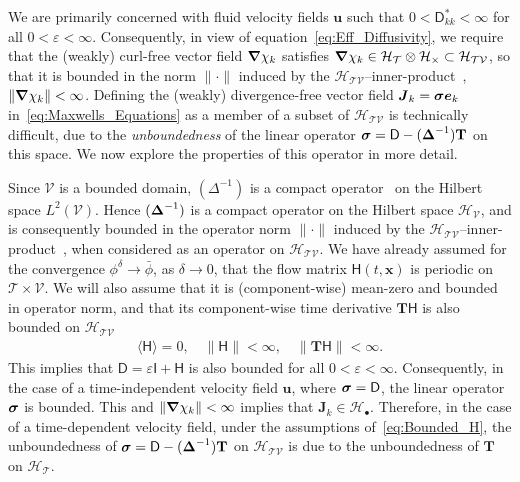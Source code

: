 \documentclass[leqno,onefignum,onetabnum]{siamltex1213}
\newcommand{\Tb}{\mathbf{T}}
\newcommand{\Tc}{\mathcal{T}}
\newcommand{\Vc}{\mathcal{V}}
\newcommand{\Hc}{\mathcal{H}}
\newcommand{\Dm}{\mathsf{D}}
\newcommand{\Hm}{\mathsf{H}}
\newcommand{\Ib}{\mathsf{I}}
\newcommand\bsig{\mbox{\boldmath${\sigma}$}}
\newcommand\bDelta{\mbox{\boldmath${\Delta}$}}
\newcommand\bnabla{\mbox{\boldmath${\nabla}$}}
\newcommand{\vecJ}{\boldsymbol{J}}
\newcommand{\vecx}{\boldsymbol{x}}
\newcommand{\vecu}{\boldsymbol{u}}
\newcommand{\vece}{\boldsymbol{e}}
\begin{document}
We are primarily concerned with fluid velocity fields $\vecu $ such
that $0<\Dm^*_{kk}<\infty$ for all $0<\varepsilon<\infty$. Consequently, in view of
equation~\eqref{eq:Eff_Diffusivity}, we require that the (weakly)
curl-free vector field $\bnabla \chi_k$ satisfies
$\bnabla \chi_k\in\Hc_{\Tc}\otimes\Hc_\times\subset\Hc_{\Tc\Vc}$, so that it is
bounded in the norm $\|\cdot\|$ induced by the
$\Hc_{\Tc\Vc}$--inner-product~\cite{Folland:99:RealAnalysis}, $\|\bnabla
\chi_k\|<\infty$. Defining the (weakly) 
divergence-free vector field $\vecJ_k=\bsig\vece _k$
in~\eqref{eq:Maxwells_Equations} as a member of a subset of 
$\Hc_{\Tc\Vc}$ is technically difficult, due to the
\emph{unboundedness} of the linear operator
$\bsig=\Dm-(\bDelta^{-1})\Tb$ on this space. We now explore the
properties of this operator in more detail.  





Since $\Vc$ is a bounded domain, $(\Delta^{-1})$ is a compact
operator~\cite{Stakgold:BVP:2000} on the Hilbert space
$L^2(\Vc)$. Hence 
$(\bDelta^{-1})$ is a compact operator on the Hilbert space
$\Hc_{\Vc}$, and is consequently bounded in the operator norm $\|\cdot\|$
induced by the
$\Hc_{\Tc\Vc}$--inner-product~\cite{Reed-1980,Stone:64,Stakgold:BVP:2000},
when considered as an  
operator on $\Hc_{\Tc\Vc}$.  We have already assumed 
for the convergence $\phi^\delta\to\bar{\phi}$, as $\delta\to0$, that the flow matrix
$\Hm(t,\vecx)$ is periodic on $\Tc\times\Vc$. We will also assume that it
is (component-wise) mean-zero and bounded in operator norm, and that
its component-wise time derivative $\Tb\Hm$ is also bounded on
$\Hc_{\Tc\Vc}$ 
%
\begin{align}\label{eq:Bounded_H}
  \langle\Hm\rangle=0, \quad \|\Hm\|<\infty, \quad \|\Tb\Hm\|<\infty.
\end{align}
%
This implies that $\Dm=\varepsilon\Ib+\Hm$ is also bounded for all
$0<\varepsilon<\infty$. Consequently, in the case of a time-independent velocity 
field $\vecu $, where $\bsig=\Dm$, the linear operator $\bsig$ is
bounded. This and $\|\bnabla \chi_k\|<\infty$ implies that 
$\vecJ_k\in\Hc_\bullet$. Therefore, in the case of a time-dependent velocity
field, under the assumptions of~\eqref{eq:Bounded_H}, the
unboundedness of $\bsig=\Dm-(\bDelta^{-1})\Tb$ on $\Hc_{\Tc\Vc}$
is due to the unboundedness of $\Tb$ on $\Hc_{\Tc}$.   
\end{document}
